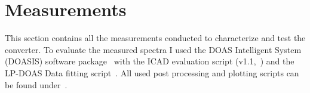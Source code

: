 \section{Measurements}
\label{sec:measurements}

This section contains all the measurements conducted to characterize
and test the converter. To evaluate the measured spectra I used the
DOAS Intelligent System (DOASIS) software package~\cite{doasis} with
the ICAD evaluation script (v1.1,~\cite{martin}) and the LP-DOAS
Data fitting script~\cite{denis}. All used post processing and
plotting scripts can be found under~\cite{scripts}.

